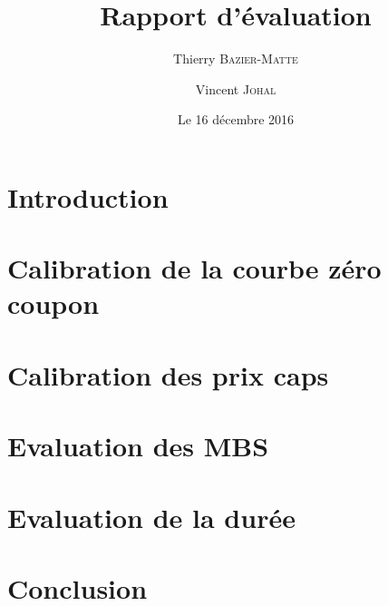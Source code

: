 \documentclass[10pt,fleqn]{article}
\title{Rapport d'évaluation}
\author{Thierry \textsc{Bazier-Matte} \and Vincent \textsc{Johal}}
\date{Le 16 décembre 2016}
\begin{document}
\maketitle

\section{Introduction}


\section{Calibration de la courbe zéro coupon}



\section{Calibration des prix caps}


\section{Evaluation des MBS}


\section{Evaluation de la durée}


\section{Conclusion}





\end{document}
